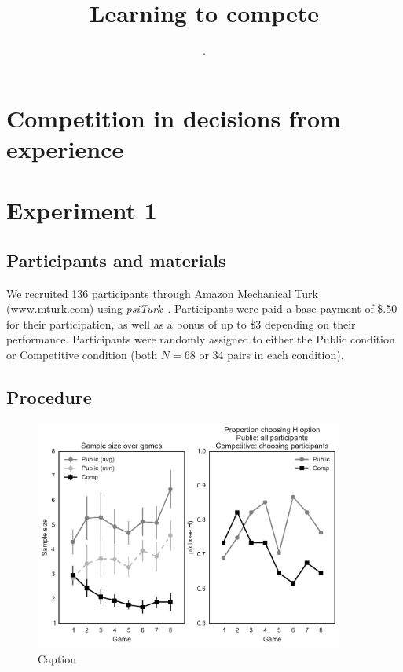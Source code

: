 \documentclass[11pt,jou]{apa6}
\title{Learning to compete}
\author{.}
\affiliation{.}
\begin{document}
\maketitle




\section{Competition in decisions from experience}

\cite{phillips2014rivals}

\section{Experiment 1}

\subsection{Participants and materials}

We recruited 136 participants through Amazon Mechanical Turk (www.mturk.com) using \emph{psiTurk}~\cite{gureckis2015psiturk}.
Participants were paid a base payment of \$.50 for their participation, as well as a bonus of up to \$3 depending on their performance.
Participants were randomly assigned to either the Public condition or Competitive condition (both $N=68$ or 34 pairs in each condition).

\subsection{Procedure}

\begin{figure}[htbp]
\centerline{\includegraphics[width=4in]{figures/exp1_results.pdf}}
\caption{Caption}
\label{exp1_results.fig}
\end{figure}
\end{document}
